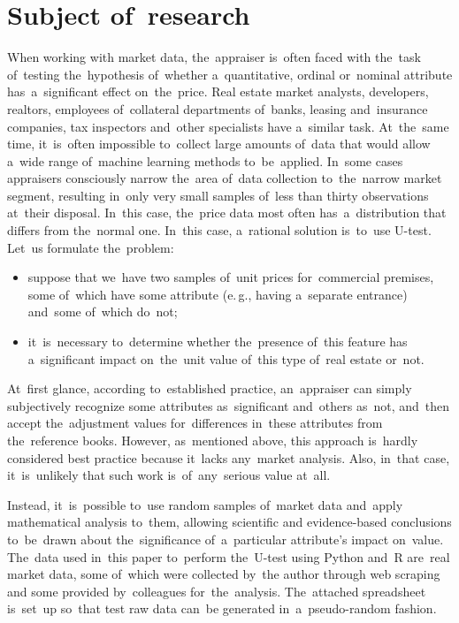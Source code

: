 \documentclass[russian,english]{scrreprt}
\begin{document}
\chapter{Subject of~research}
When working with market data, the~appraiser is~often faced with the~task of~testing the~hypothesis of~whether a~quantitative, ordinal or~nominal attribute has~a~significant effect on~the~price. Real estate market analysts, developers, realtors, employees of~collateral departments of~banks, leasing and~insurance companies, tax inspectors and~other specialists have a~similar task. At~the~same time, it~is~often impossible to~collect large amounts of~data that would allow a~wide range of~machine learning methods to~be~applied. In~some cases appraisers consciously narrow the~area of~data collection to~the~narrow market segment, resulting in~only very small samples of~less than thirty observations at~their disposal. In~this case, the~price data most often has~a~distribution that differs from the~normal one. In~this case, a~rational solution is~to~use U-test. Let~us formulate the~problem:
\begin{itemize}
	\item suppose that we~have two samples of~unit prices for~commercial premises, some of~which have some attribute (e.\,g., having a~separate entrance) and~some of~which do~not;
	\item it~is~necessary to~determine whether the~presence of~this feature has a~significant impact on~the~unit value of~this type of~real estate or~not.
\end{itemize}
At~first glance, according to~established practice, an~appraiser can simply subjectively recognize some attributes as~significant and~others as~not, and~then accept the~adjustment values for~differences in~these attributes from the~reference books. However, as~mentioned above, this approach is~hardly considered best practice because it~lacks any~market analysis. Also, in~that case, it~is~unlikely that such work is~of~any~serious value at~all.

Instead, it~is~possible to~use random samples of~market data and~apply mathematical analysis to~them, allowing scientific and evidence-based conclusions to~be~drawn about the~significance of~a~particular attribute's impact on~value. The~data used in~this paper to~perform the~U-test using Python and~R are~real market data, some of~which were collected by~the author through web scraping and some provided by~colleagues for~the~analysis. The~attached spreadsheet is~set~up so~that test raw data can~be generated in~a~pseudo-random fashion.
\end{document}
